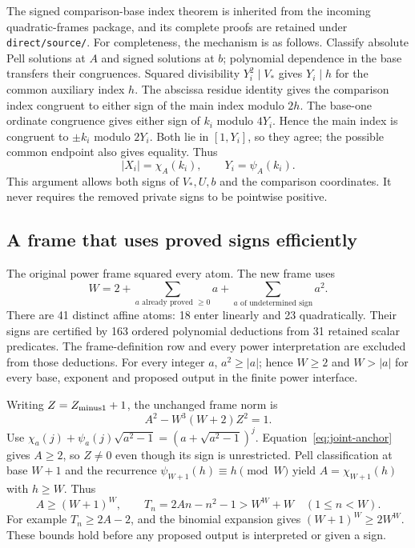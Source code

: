 The signed comparison-base index theorem is inherited from the incoming
quadratic-frames package, and its complete proofs are retained under
\texttt{direct/source/}.  For completeness, the mechanism is as follows.
Classify absolute Pell solutions at $A$ and signed solutions at $b$;
polynomial dependence in the base transfers their congruences.
Squared divisibility $Y_i^2\mid V_*$ gives $Y_i\mid h$ for the common
auxiliary index $h$.  The abscissa residue identity gives the comparison
index congruent to either sign of the main index modulo $2h$.
The base-one ordinate congruence gives either sign of $k_i$ modulo $4Y_i$.
Hence the main index is congruent to $\pm k_i$ modulo $2Y_i$.
Both lie in $[1,Y_i]$, so they agree; the possible common endpoint also
gives equality.  Thus
\[
 |X_i|=\chi_A(k_i),\qquad Y_i=\psi_A(k_i).
\]
This argument allows both signs of $V_*,U,b$ and the comparison coordinates.
It never requires the removed private signs to be pointwise positive.

\subsection{A frame that uses proved signs efficiently}

The original power frame squared every atom.  The new frame uses
\begin{equation}\label{eq:typed-frame}
 W=2+\sum_{a\text{ already proved }\ge0}a
       +\sum_{a\text{ of undetermined sign}}a^2.
\end{equation}
There are 41 distinct affine atoms: 18 enter linearly and 23 quadratically.
Their signs are certified by 163 ordered polynomial deductions from 31
retained scalar predicates.  The frame-definition row and every power
interpretation are excluded from those deductions.
For every integer $a$, $a^2\ge|a|$; hence $W\ge2$ and $W>|a|$ for every
base, exponent and proposed output in the finite power interface.

Writing $Z=Z_{\rm minus1}+1$, the unchanged frame norm is
\[
 A^2-W^3(W+2)Z^2=1.
\]
Use $\chi_a(j)+\psi_a(j)\sqrt{a^2-1}=(a+\sqrt{a^2-1})^j$.
Equation~\eqref{eq:joint-anchor} gives $A\ge2$, so $Z\ne0$ even though
its sign is unrestricted.  Pell classification at base $W+1$ and the
recurrence $\psi_{W+1}(h)\equiv h\pmod W$ yield
$A=\chi_{W+1}(h)$ with $h\ge W$.  Thus
\[
 A\ge(W+1)^W,\qquad
 T_n=2An-n^2-1>W^W+W \quad(1\le n<W).
\]
For example $T_n\ge2A-2$, and the binomial expansion gives
$(W+1)^W\ge2W^W$.  These bounds hold before any proposed output is
interpreted or given a sign.

